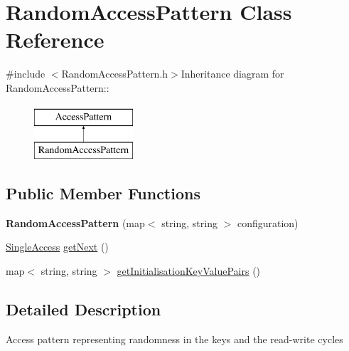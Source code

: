 \hypertarget{classRandomAccessPattern}{
\section{RandomAccessPattern Class Reference}
\label{classRandomAccessPattern}
}


{\ttfamily \#include $<$RandomAccessPattern.h$>$}Inheritance diagram for RandomAccessPattern::\begin{figure}[H]
\begin{center}
\leavevmode
\includegraphics[height=2cm]{classRandomAccessPattern}
\end{center}
\end{figure}
\subsection*{Public Member Functions}
\begin{DoxyCompactItemize}
\item 
\hypertarget{classRandomAccessPattern_ad0dc7a4ff575c695277f449df68912c0}{
{\bfseries RandomAccessPattern} (map$<$ string, string $>$ configuration)}
\label{classRandomAccessPattern_ad0dc7a4ff575c695277f449df68912c0}

\item 
\hyperlink{structSingleAccess}{SingleAccess} \hyperlink{classRandomAccessPattern_a5b590afc37a8bf5e4a4235834c6ebe12}{getNext} ()
\item 
map$<$ string, string $>$ \hyperlink{classRandomAccessPattern_a72da825a9cb74f58fcadf6fc894d5e82}{getInitialisationKeyValuePairs} ()
\end{DoxyCompactItemize}


\subsection{Detailed Description}
Access pattern representing randomness in the keys and the read-\/write cycles 


